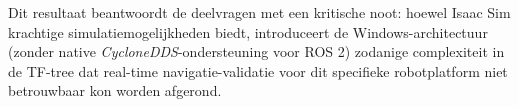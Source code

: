 Dit resultaat beantwoordt de deelvragen met een kritische noot: hoewel Isaac Sim krachtige simulatiemogelijkheden biedt, introduceert de Windows-architectuur (zonder native \textit{CycloneDDS}-ondersteuning voor ROS 2) zodanige complexiteit in de TF-tree dat real-time navigatie-validatie voor dit specifieke robotplatform niet betrouwbaar kon worden afgerond.